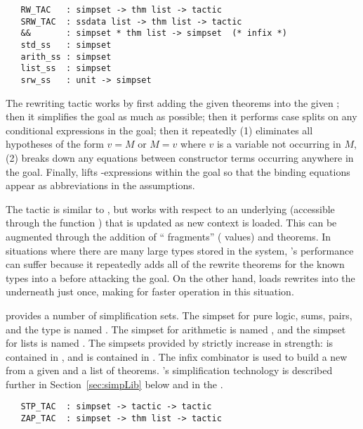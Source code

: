 \begin{verbatim}
   RW_TAC   : simpset -> thm list -> tactic
   SRW_TAC  : ssdata list -> thm list -> tactic
   &&       : simpset * thm list -> simpset  (* infix *)
   std_ss   : simpset
   arith_ss : simpset
   list_ss  : simpset
   srw_ss   : unit -> simpset
\end{verbatim}

 The rewriting tactic  works by
first adding the given theorems into the given \simpset; then it
simplifies the goal as much as possible; then it performs case splits
on any conditional expressions in the goal; then it repeatedly (1)
eliminates all hypotheses of the form $v = M$ or $M = v$ where $v$ is
a variable not occurring in $M$, (2) breaks down any equations between
constructor terms occurring anywhere in the goal. Finally,
 lifts -expressions within the goal so that
the binding equations appear as
abbreviations in the
assumptions.

 The tactic  is similar to
, but works with respect to an underlying \simpset{}
(accessible through the function ) that is updated as new
context is loaded.  This \simpset{} can be augmented through the
addition of ``\simpset{} fragments'' ( values) and
theorems.  In situations where there are many large types stored in
the system, 's performance can suffer because it
repeatedly adds all of the rewrite theorems for the known types into a
\simpset{} before attacking the goal.  On the other hand,
 loads rewrites into the \simpset{} underneath
 just once, making for faster operation in this
situation.

 provides a number of simplification sets. The
simpset for pure logic, sums, pairs, and the  type is
named . The simpset for arithmetic is named
, and the simpset for lists is named .
The simpsets provided by \bossLib{} strictly increase in strength:
 is contained in , and  is
contained in .  The infix combinator \ml{\&\&} is used
to build a new \simpset{} from a given \simpset{} and a list of
theorems. \HOL's simplification technology is described further in
Section~\ref{sec:simpLib} below and in the \REFERENCE.

\begin{verbatim}
   STP_TAC  : simpset -> tactic -> tactic
   ZAP_TAC  : simpset -> thm list -> tactic
\end{verbatim}

